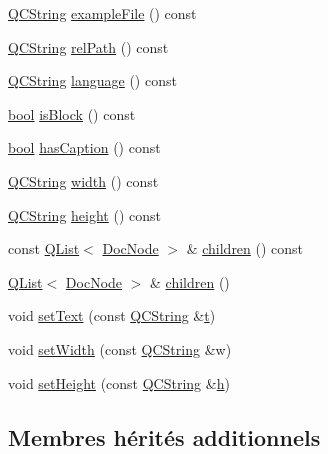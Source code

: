 \begin{DoxyCompactItemize}
\item 
\hyperlink{class_q_c_string}{Q\+C\+String} \hyperlink{class_doc_verbatim_af4952866820adc88aa826e94d06c9d03}{example\+File} () const 
\item 
\hyperlink{class_q_c_string}{Q\+C\+String} \hyperlink{class_doc_verbatim_a53573f00a7f94e3a032984eb286a6278}{rel\+Path} () const 
\item 
\hyperlink{class_q_c_string}{Q\+C\+String} \hyperlink{class_doc_verbatim_a3b9f6e3332f39e193476818c53b889ae}{language} () const 
\item 
\hyperlink{qglobal_8h_a1062901a7428fdd9c7f180f5e01ea056}{bool} \hyperlink{class_doc_verbatim_a50bad443d6c85c88afcf8e435b10e062}{is\+Block} () const 
\item 
\hyperlink{qglobal_8h_a1062901a7428fdd9c7f180f5e01ea056}{bool} \hyperlink{class_doc_verbatim_a124133e2eed6342f646102ce98a191e1}{has\+Caption} () const 
\item 
\hyperlink{class_q_c_string}{Q\+C\+String} \hyperlink{class_doc_verbatim_a0b3fd0bc8b66bcf2a7a68194a4906b41}{width} () const 
\item 
\hyperlink{class_q_c_string}{Q\+C\+String} \hyperlink{class_doc_verbatim_a1d4b6822d52eb820e13676d167852d8d}{height} () const 
\item 
const \hyperlink{class_q_list}{Q\+List}$<$ \hyperlink{class_doc_node}{Doc\+Node} $>$ \& \hyperlink{class_doc_verbatim_ac9e2d852b3be08e507c57318cb63bcf2}{children} () const 
\item 
\hyperlink{class_q_list}{Q\+List}$<$ \hyperlink{class_doc_node}{Doc\+Node} $>$ \& \hyperlink{class_doc_verbatim_a425864e094bd6f5e27956fcf16c5f628}{children} ()
\item 
void \hyperlink{class_doc_verbatim_adeaf27e33a2f7b1bbad7a4145b552ebe}{set\+Text} (const \hyperlink{class_q_c_string}{Q\+C\+String} \&\hyperlink{058__bracket__recursion_8tcl_a69e959f6901827e4d8271aeaa5fba0fc}{t})
\item 
void \hyperlink{class_doc_verbatim_a449e27f3608c2922c7148116dae5baf7}{set\+Width} (const \hyperlink{class_q_c_string}{Q\+C\+String} \&w)
\item 
void \hyperlink{class_doc_verbatim_a80b5ab2b1553cc50dd73bc3fecdddb3a}{set\+Height} (const \hyperlink{class_q_c_string}{Q\+C\+String} \&\hyperlink{060__command__switch_8tcl_af96fd0966e32a310a0778d2e5c357700}{h})
\end{DoxyCompactItemize}
\subsection*{Membres hérités additionnels}


